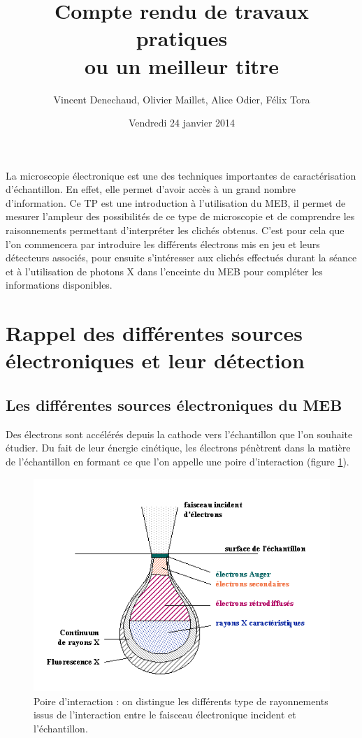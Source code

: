 \documentclass[a4paper,12pt]{article}
\title{Compte rendu de travaux pratiques\\ \small ou un meilleur titre}
\author{Vincent Denechaud, Olivier Maillet, Alice Odier, Félix Tora}
\date{Vendredi 24 janvier 2014}
\begin{document}
\maketitle

La microscopie électronique est une des techniques importantes de caractérisation d'échantillon. En effet, elle permet d'avoir accès à un grand nombre d'information. Ce TP est une introduction à l'utilisation du MEB, il permet de mesurer l'ampleur des possibilités de ce type de microscopie et de comprendre les raisonnements permettant d'interpréter les clichés obtenus. C'est pour cela que l'on commencera par introduire les différents électrons mis en jeu et leurs détecteurs associés, pour ensuite s'intéresser aux clichés effectués durant la séance et à l'utilisation de photons X dans l'enceinte du MEB pour compléter les informations disponibles.


\section{Rappel des différentes sources électroniques et leur détection}


\subsection{Les différentes sources électroniques du MEB}

Des électrons sont accélérés depuis la cathode vers l'échantillon que l'on souhaite étudier. Du fait de leur énergie cinétique, les électrons pénètrent dans la matière de l'échantillon en formant ce que l'on appelle une poire d'interaction (figure \ref{fig:poire_int}).

\begin{figure}
\centering
\includegraphics[width = 0.8 \textwidth]{images/poire_int.png}
\caption{Poire d'interaction : on distingue les différents type de rayonnements issus de l'interaction entre le faisceau électronique incident et l'échantillon.}
\label{fig:poire_int}
\end{figure}
\end{document}
